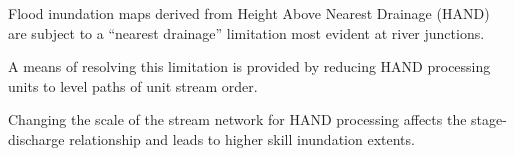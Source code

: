 

%
\begin{keypoints}
\item Flood inundation maps derived from Height Above Nearest Drainage (HAND) are subject to a ``nearest drainage'' limitation most evident at river junctions.
\item A means of resolving this limitation is provided by reducing HAND processing units to level paths of unit stream order.
\item Changing the scale of the stream network for HAND processing affects the stage-discharge relationship and leads to higher skill inundation extents.
\end{keypoints}
%
